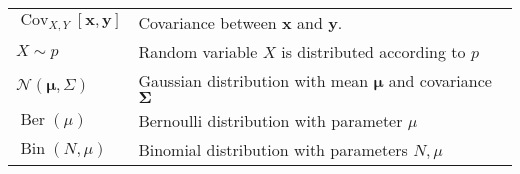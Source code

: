 \begin{table}
\begin{tabular}{ll}
    $\operatorname{Cov}_{X, Y}[\boldsymbol{x}, \boldsymbol{y}]$ & Covariance between $\boldsymbol{x}$ and $\boldsymbol{y}$. \\
    $X \sim p$ & Random variable $X$ is distributed according to $p$ \\
    $\mathcal{N}(\boldsymbol{\mu}, \Sigma)$ & Gaussian distribution with mean $\boldsymbol{\mu}$ and covariance $\boldsymbol{\Sigma}$ \\
    $\operatorname{Ber}(\mu)$ & Bernoulli distribution with parameter $\mu$ \\
    $\operatorname{Bin}(N, \mu)$ & Binomial distribution with parameters $N, \mu$ \\
    \bottomrule
\end{tabular}
\end{table}

